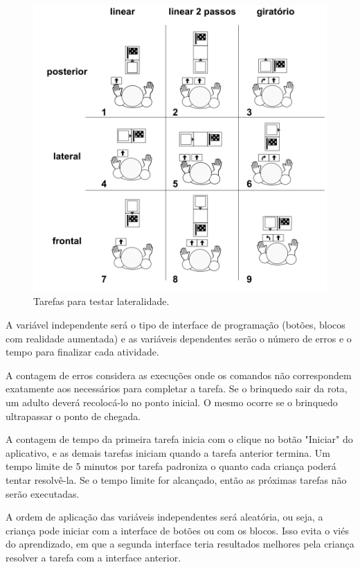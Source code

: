 \begin{figure}[!hbt]
    \centering
    \includegraphics[width=.9\textwidth,fbox]{figs/lateralidade.png}
    \caption{Tarefas para testar lateralidade.}
    \sourceauthor
    \label{fig:lateralidade}
\end{figure}

A variável independente será o tipo de interface de programação (botões, blocos com realidade aumentada) e as variáveis dependentes serão o número de erros e o tempo para finalizar cada atividade.  

A contagem de erros considera as execuções onde os comandos não correspondem exatamente aos necessários para completar a tarefa. Se o brinquedo sair da rota, um adulto deverá recolocá-lo no ponto inicial. O mesmo ocorre se o brinquedo ultrapassar o ponto de chegada.

A contagem de tempo da primeira tarefa inicia com o clique no botão "Iniciar" do aplicativo, e as demais tarefas iniciam quando a tarefa anterior termina. Um tempo limite de 5 minutos por tarefa padroniza o quanto cada criança poderá tentar resolvê-la. Se o tempo limite for alcançado, então as próximas tarefas não serão executadas.

A ordem de aplicação das variáveis independentes será aleatória, ou seja, a criança pode iniciar com a interface de botões ou com os blocos. Isso evita o viés do aprendizado, em que a segunda interface teria resultados melhores pela criança resolver a tarefa com a interface anterior.


